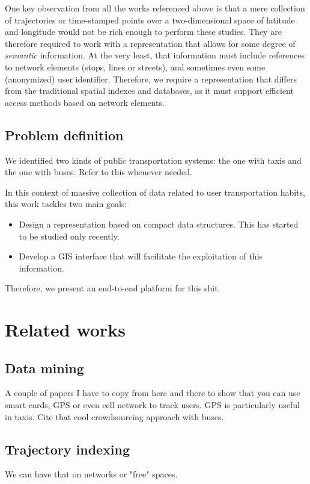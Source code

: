 \documentclass{UniVieCS_PhD} %
\begin{document}
	One key observation from all the works referenced above is that a mere collection of trajectories or time-stamped points over a two-dimensional space of latitude and longitude would not be rich enough to perform these studies. They are therefore required to work with a representation that allows for some degree of \textit{semantic} information. At the very least, that information must include references to network elements (stops, lines or streets), and sometimes even some (anonymized) user identifier. Therefore, we require a representation that differs from the traditional spatial indexes and databases, as it must support efficient access methods based on network elements.
	
	\subsection{Problem definition}
	\label{sec:pd}
	We identified two kinds of public transportation systems: the one with taxis and the one with buses. Refer to this whenever needed.
	
	In this context of massive collection of data related to user transportation habits, this work tackles two main goals:
	
	\begin{itemize}
	    \item Design a representation based on compact data structures. This has started to be studied only recently.
	    \item Develop a GIS interface that will facilitate the exploitation of this information.
	\end{itemize}
	
	Therefore, we present an end-to-end platform for this shit.
	
	\section{Related works}
	\subsection{Data mining}
	A couple of papers I have to copy from here and there to show that you can use smart cards, GPS or even cell network to track users. GPS is particularly useful in taxis. Cite that cool crowdsourcing approach with buses.
	
	\subsection{Trajectory indexing}
	We can have that on networks or "free" spaces.
	
\end{document}
